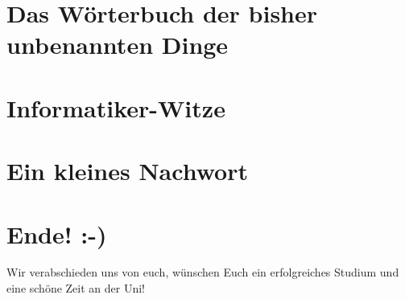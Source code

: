 \documentclass[a4paper,12pt]{scrartcl}
\newcommand{\spaltenanfang}{\begin{multicols}{2}}
\newcommand{\spaltenende}{\end{multicols}}
\begin{document}

%



\section{Das Wörterbuch der bisher unbenannten Dinge}





\newpage
\section{Informatiker-Witze}




\newpage
\section{Ein kleines Nachwort}




\section*{Ende! :-)}

Wir verabschieden uns von euch, wünschen Euch ein erfolgreiches Studium und eine schöne Zeit an der Uni!

\newpage
\end{document}

